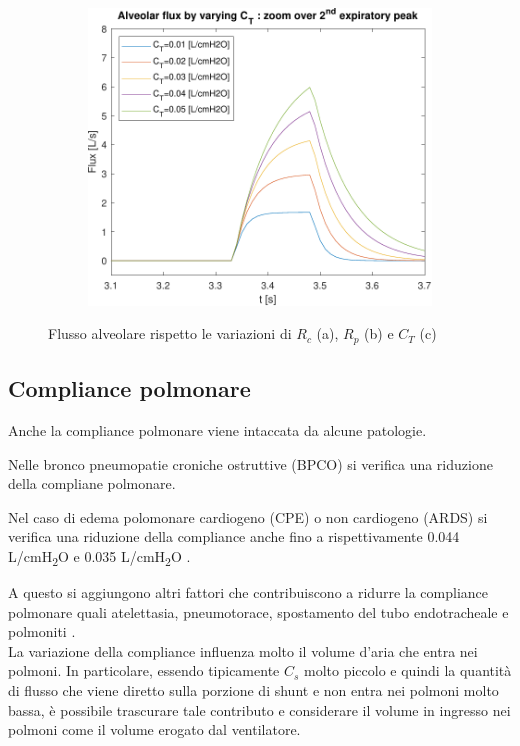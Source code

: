 \begin{figure}[t!]
\begin{subfigure}{0.33\linewidth}
	\centering
	\includegraphics[width=0.95\linewidth]{../model/data_log/CwCL_alveolar_flux_zoom.pdf}
	\caption{}
\end{subfigure}\hfill
	\caption{Flusso alveolare rispetto le variazioni di $R_c$ (a), $R_p$ (b) e $C_T$ (c)}
\label{fig:flux_alveolar}
\end{figure}



\subsection{Compliance polmonare}

Anche la compliance polmonare viene intaccata da alcune patologie.

Nelle bronco pneumopatie croniche ostruttive (BPCO) si verifica una riduzione della compliane polmonare.

Nel caso di edema polomonare cardiogeno (CPE) o non cardiogeno (ARDS) si verifica una riduzione della compliance anche fino a rispettivamente 0.044 L/cmH\textsubscript{2}O e 0.035 L/cmH\textsubscript{2}O \cite{milic-emili_basics_1999}.

A questo si aggiungono altri fattori che contribuiscono a ridurre la compliance polmonare quali atelettasia, pneumotorace, spostamento del tubo endotracheale e polmoniti \cite{grossbach_overview_2011}.
\\

La variazione della compliance influenza molto il volume d'aria che entra nei polmoni. In particolare, essendo tipicamente $C_s$ molto piccolo e quindi la quantità di flusso che viene diretto sulla porzione di shunt e non entra nei polmoni molto bassa, è possibile trascurare tale contributo e considerare il volume in ingresso nei polmoni come il volume erogato dal ventilatore.

